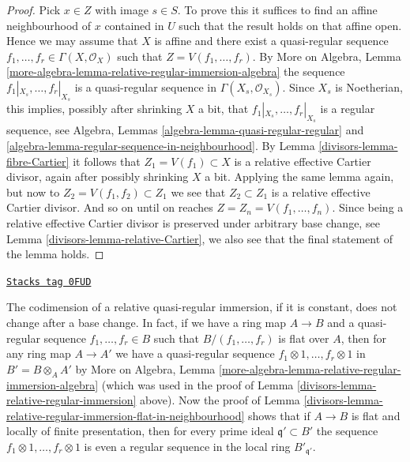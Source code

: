 \begin{proof}

Pick $x \in Z$ with image $s \in S$. To prove this it suffices to
find an affine neighbourhood of $x$ contained in $U$ such that the
result holds on that affine open. Hence we may assume that $X$ is affine
and there exist a quasi-regular sequence
$f_1, \ldots, f_r \in \Gamma(X, \mathcal{O}_X)$
such that $Z = V(f_1, \ldots, f_r)$. By
More on Algebra, Lemma
\ref{more-algebra-lemma-relative-regular-immersion-algebra}
the sequence $f_1|_{X_s}, \ldots, f_r|_{X_s}$ is a
quasi-regular sequence in $\Gamma(X_s, \mathcal{O}_{X_s})$.
Since $X_s$ is Noetherian, this implies, possibly after shrinking
$X$ a bit, that $f_1|_{X_s}, \ldots, f_r|_{X_s}$ is a regular
sequence, see
Algebra, Lemmas \ref{algebra-lemma-quasi-regular-regular} and
\ref{algebra-lemma-regular-sequence-in-neighbourhood}.
By
Lemma \ref{divisors-lemma-fibre-Cartier}
it follows that $Z_1 = V(f_1) \subset X$ is a relative effective
Cartier divisor, again after possibly shrinking $X$ a bit.
Applying the same lemma again, but now to $Z_2 = V(f_1, f_2) \subset Z_1$
we see that $Z_2 \subset Z_1$ is a relative effective Cartier divisor.
And so on until on reaches $Z = Z_n = V(f_1, \ldots, f_n)$.
Since being a relative effective Cartier divisor is preserved under
arbitrary base change, see
Lemma \ref{divisors-lemma-relative-Cartier},
we also see that the final statement of the lemma holds.
\end{proof}

\begin{remark}
\label{divisors-remark-relative-regular-immersion-elements}
\href{https://stacks.math.columbia.edu/tag/0FUD}{\texttt{Stacks tag 0FUD}}

The codimension of a relative quasi-regular immersion,
if it is constant, does not change after a base change.
In fact, if we have a ring map $A \to B$ and a quasi-regular
sequence $f_1, \ldots, f_r \in B$ such that $B/(f_1, \ldots, f_r)$
is flat over $A$, then for any ring map $A \to A'$
we have a quasi-regular sequence
$f_1 \otimes 1, \ldots, f_r \otimes 1$ in $B' = B \otimes_A A'$
by More on Algebra, Lemma
\ref{more-algebra-lemma-relative-regular-immersion-algebra}
(which was used in the proof of
Lemma \ref{divisors-lemma-relative-regular-immersion} above).
Now the proof of
Lemma \ref{divisors-lemma-relative-regular-immersion-flat-in-neighbourhood}
shows that if $A \to B$ is flat and locally of finite
presentation, then for every prime ideal $\mathfrak q' \subset B'$
the sequence
$f_1 \otimes 1, \ldots, f_r \otimes 1$ is even a
regular sequence in the local ring $B'_{\mathfrak q'}$.
\end{remark}

